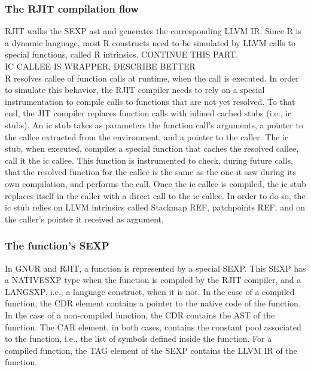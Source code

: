 \subsubsection{The RJIT compilation flow}
RJIT walks the SEXP ast and generates the corresponding LLVM IR.
Since R is a dynamic language, most R constructs need to be simulated by LLVM calls to special functions, called R intrinsics.
CONTINUE THIS PART.\\

IC CALLEE IS WRAPPER, DESCRIBE BETTER\\
R resolves callee of function calls at runtime, when the call is executed.
In order to simulate this behavior, the RJIT compiler needs to rely on a special instrumentation to compile calls to functions that are not yet resolved.
To that end, the JIT compiler replaces function calls with inlined cached stubs (i.e., ic stubs).
An ic stub takes as parameters the function call's arguments, a pointer to the callee extracted from the environment, and a pointer to the caller.
The ic stub, when executed, compiles a special function that caches the resolved callee, call it the ic callee.
This function is instrumented to check, during future calls, that the resolved function for the callee is the same as the one it saw during its own compilation, and performs the call.
Once the ic callee is compiled, the ic stub replaces itself in the caller with a direct call to the ic callee.
In order to do so, the ic stub relies on LLVM intrinsics called Stackmap REF, patchpoints REF, and on the caller's pointer it received as argument.\\

\subsubsection{The function's SEXP}
In GNUR and RJIT, a function is represented by a special SEXP. 
This SEXP has a NATIVESXP type when the function is compiled by the RJIT compiler, and a LANGSXP, i.e., a language construct, when it is not.
In the case of a compiled function, the CDR element contains a pointer to the native code of the function.
In the case of a non-compiled function, the CDR contains the AST of the function.
The CAR element, in both cases, contains the constant pool associated to the function, i.e., the list of symbols defined inside the function.
For a compiled function, the TAG element of the SEXP contains the LLVM IR of the function.\\

